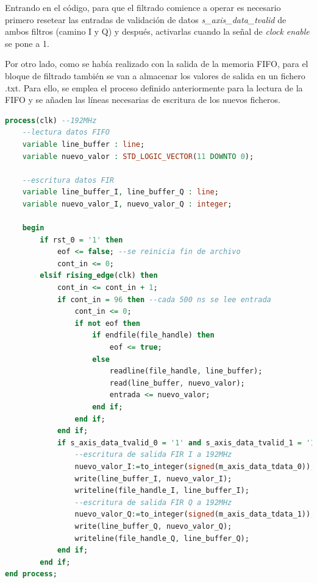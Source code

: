 \pagebreak

Entrando en el código, para que el filtrado comience a operar es necesario primero resetear las entradas de validación de datos \textit{s\_axis\_data\_tvalid} de ambos filtros (camino I y Q) y después, activarlas cuando la señal de \textit{clock enable} se pone a 1. 

Por otro lado, como se había realizado con la salida de la memoria FIFO, para el bloque de filtrado también se van a almacenar los valores de salida en un fichero .txt. Para ello, se emplea el proceso definido anteriormente para la lectura de la FIFO y se añaden las líneas necesarias de escritura de los nuevos ficheros.

\vspace{5mm}

\begin{lstlisting}[language=vhdl, style=mystyle, caption={Proceso de escritura de los ficheros FIR\_output\_I.txt y FIR\_output\_Q.txt}]
process(clk) --192MHz
    --lectura datos FIFO
    variable line_buffer : line;
    variable nuevo_valor : STD_LOGIC_VECTOR(11 DOWNTO 0);
    
    --escritura datos FIR
    variable line_buffer_I, line_buffer_Q : line;
    variable nuevo_valor_I, nuevo_valor_Q : integer;
    
    begin
        if rst_0 = '1' then
            eof <= false; --se reinicia fin de archivo
            cont_in <= 0;
        elsif rising_edge(clk) then
            cont_in <= cont_in + 1;
            if cont_in = 96 then --cada 500 ns se lee entrada 
                cont_in <= 0;
                if not eof then
                    if endfile(file_handle) then 
                        eof <= true; 
                    else
                        readline(file_handle, line_buffer);
                        read(line_buffer, nuevo_valor);
                        entrada <= nuevo_valor;
                    end if;
                end if;
            end if; 
            if s_axis_data_tvalid_0 = '1' and s_axis_data_tvalid_1 = '1' and not eof then 
                --escritura de salida FIR I a 192MHz
                nuevo_valor_I:=to_integer(signed(m_axis_data_tdata_0));
                write(line_buffer_I, nuevo_valor_I); 
                writeline(file_handle_I, line_buffer_I); 
                --escritura de salida FIR Q a 192MHz
                nuevo_valor_Q:=to_integer(signed(m_axis_data_tdata_1));
                write(line_buffer_Q, nuevo_valor_Q); 
                writeline(file_handle_Q, line_buffer_Q);
            end if;                      
        end if;
end process; 
\end{lstlisting}

